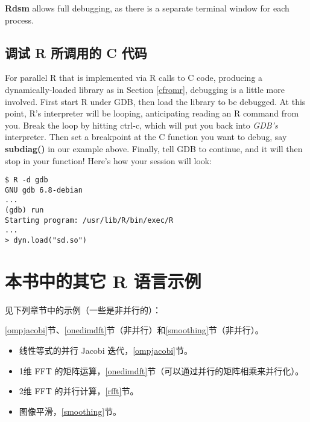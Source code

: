 {\bf Rdsm} allows full debugging, as there is a separate terminal window
for each process.

\subsection{调试 R 所调用的 C 代码}

For parallel R that is implemented via R calls to C code, producing a
dynamically-loaded library as in Section \ref{cfromr}, debugging is a
little more involved.  First start R under GDB, then load the library to
be debugged.  At this point, R's interpreter will be looping,
anticipating reading an R command from you.  Break the loop by hitting
ctrl-c, which will put you back into {\it GDB's} interpreter.  Then set
a breakpoint at the C function you want to debug, say {\bf subdiag()} in
our example above.  Finally, tell GDB to continue, and it will then stop
in your function!  Here's how your session will look:

\begin{lstlisting}
$ R -d gdb
GNU gdb 6.8-debian
...
(gdb) run
Starting program: /usr/lib/R/bin/exec/R
...
> dyn.load("sd.so")
\end{lstlisting}

\section{本书中的其它 R 语言示例}

见下列章节中的示例（一些是非并行的）：

\ref{ompjacobi}节、\ref{onedimdft}节（非并行）和\ref{smoothing}节（非并行）。

\begin{itemize}

\item 线性等式的并行 Jacobi 迭代，\ref{ompjacobi}节。

\item 1维 FFT 的矩阵运算，\ref{onedimdft}节（可以通过并行的矩阵相乘来并行化）。

\item 2维 FFT 的并行计算，\ref{rfft}节。

\item 图像平滑，\ref{smoothing}节。

\end{itemize}



